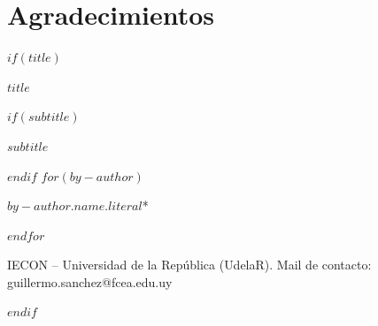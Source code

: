 \section*{Agradecimientos}
\thispagestyle{empty}

$if(title)$
\cleardoublepage
\thispagestyle{empty}
{\centering
{\huge\bfseries $title$ \par}
$if(subtitle)$
\vspace{1ex}
{\Large\bfseries $subtitle$ \par}
$endif$
\vspace{3ex}
$for(by-author)$
{\large $by-author.name.literal$*\par}
$endfor$
\vspace{3ex}
}
{\begin{quote}
{\footnotesize
\onehalfspacing

}
\end{quote}\par}
{\vfill}
{\footnotesize * IECON -- Universidad de la República (UdelaR). 
Mail de contacto: guillermo.sanchez@fcea.edu.uy\par}
{\small\par}
$endif$
